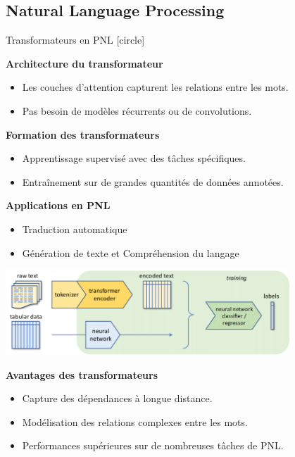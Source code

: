\documentclass{beamer}
\begin{document}
\subsection{Natural Language Processing}
\begin{frame}[t]{Transformateurs en PNL}
	[circle]
	
			\textbf{Architecture du transformateur}
			\begin{itemize}
				\item Les couches d'attention capturent les relations entre les mots.
				\item Pas besoin de modèles récurrents ou de convolutions.
			\end{itemize}
			
			
			\textbf{Formation des transformateurs}
			\begin{itemize}
				\item Apprentissage supervisé avec des tâches spécifiques.
				\item Entraînement sur de grandes quantités de données annotées.
			\end{itemize}	
		
	\textbf{Applications en PNL}
	\begin{itemize}
		\item Traduction automatique
		\item Génération de texte et Compréhension du langage
	\end{itemize}
	\centering
\includegraphics[width=0.8\textwidth]{PNL.png}	

	\textbf{Avantages des transformateurs}
	\begin{itemize}
		\item Capture des dépendances à longue distance.
		\item Modélisation des relations complexes entre les mots.
		\item Performances supérieures sur de nombreuses tâches de PNL.
	\end{itemize}
\end{frame}
\end{document}
